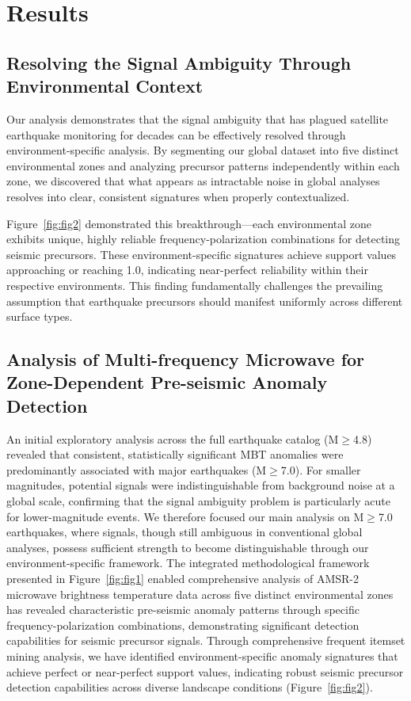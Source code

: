 \documentclass[preprint,review,12pt,authoryear]{elsarticle}
\begin{document}
\section{Results}
\subsection{Resolving the Signal Ambiguity Through Environmental Context}
Our analysis demonstrates that the signal ambiguity that has plagued satellite earthquake monitoring for decades can be effectively resolved through environment-specific analysis. By segmenting our global dataset into five distinct environmental zones and analyzing precursor patterns independently within each zone, we discovered that what appears as intractable noise in global analyses resolves into clear, consistent signatures when properly contextualized.

Figure~\ref{fig:fig2} demonstrated this breakthrough---each environmental zone exhibits unique, highly reliable frequency-polarization combinations for detecting seismic precursors. These environment-specific signatures achieve support values approaching or reaching 1.0, indicating near-perfect reliability within their respective environments. This finding fundamentally challenges the prevailing assumption that earthquake precursors should manifest uniformly across different surface types.

\subsection{Analysis of Multi-frequency Microwave for Zone-Dependent Pre-seismic Anomaly Detection}
An initial exploratory analysis across the full earthquake catalog (M$\ge$4.8) revealed that consistent, statistically significant MBT anomalies were predominantly associated with major earthquakes (M$\ge$7.0). For smaller magnitudes, potential signals were indistinguishable from background noise at a global scale, confirming that the signal ambiguity problem is particularly acute for lower-magnitude events. We therefore focused our main analysis on M$\ge$7.0 earthquakes, where signals, though still ambiguous in conventional global analyses, possess sufficient strength to become distinguishable through our environment-specific framework. The integrated methodological framework presented in Figure~\ref{fig:fig1} enabled comprehensive analysis of AMSR-2 microwave brightness temperature data across five distinct environmental zones has revealed characteristic pre-seismic anomaly patterns through specific frequency-polarization combinations, demonstrating significant detection capabilities for seismic precursor signals. Through comprehensive frequent itemset mining analysis, we have identified environment-specific anomaly signatures that achieve perfect or near-perfect support values, indicating robust seismic precursor detection capabilities across diverse landscape conditions (Figure~\ref{fig:fig2}).
\end{document}
